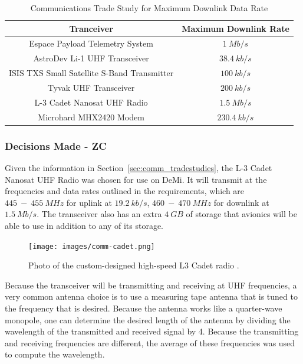 \documentclass[12pt]{article}
\begin{document}
\begin{table}[ht]
\caption{Communications Trade Study for Maximum Downlink Data Rate}
\label{table:comm_transceivers}
\begin{center}
    \begin{tabular}{| c | c |} \hline
    	Tranceiver & Maximum Downlink Rate \\ \hline \hline
Espace Payload Telemetry System & $1\ Mb/s$ \\
AstroDev Li-1 UHF Transceiver & $38.4\ kb/s$ \\
ISIS TXS Small Satellite  S-Band Transmitter & $100\ kb/s$ \\
Tyvak UHF Transceiver & $200\ kb/s$ \\
L-3 Cadet Nanosat UHF Radio & $1.5\ Mb/s$ \\
Microhard MHX2420 Modem & $230.4\ kb/s$ \\ \hline 
    \end{tabular}
\end{center}
\end{table}

			\subsubsection{Decisions Made - ZC}

Given the information in Section~\ref{sec:comm_tradestudies}, the L-3 Cadet Nanosat UHF Radio was chosen for use on DeMi. It will transmit at the frequencies and data rates outlined in the requirements, which are $445\ -\ 455\ MHz$ for uplink at $19.2\ kb/s$, $460\ -\ 470\ MHz$ for downlink at $1.5\ Mb/s$. The transceiver also has an extra $4\ GB$ of storage that avionics will be able to use in addition to any of its storage. 

\begin{figure}[ht]
\centering
  \texttt{[image: images/comm-cadet.png]}
\caption{Photo of the custom-designed high-speed L3 Cadet radio \cite{DICE}.}
\label{fig:comm_Cadet}
\end{figure}

Because the transceiver will be transmitting and receiving at UHF frequencies, a very common antenna choice is to use a measuring tape antenna that is tuned to the frequency that is desired. Because the antenna works like a quarter-wave monopole, one can determine the desired length of the antenna by dividing the wavelength of the transmitted and received signal by 4. Because the transmitting and receiving frequencies are different, the average of these frequencies was used to compute the wavelength. 
\end{document}

